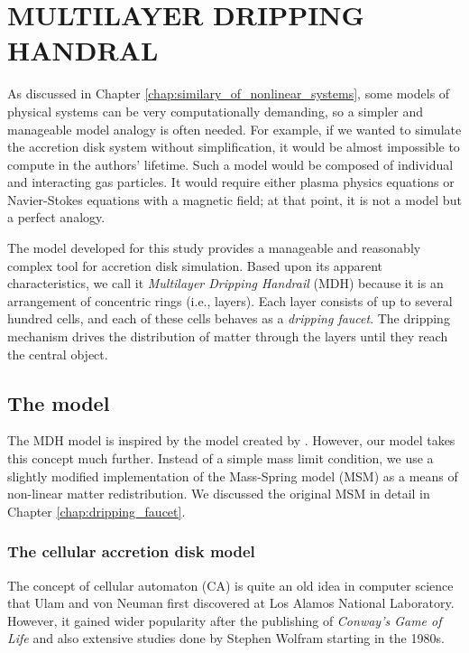 \chapter{MULTILAYER DRIPPING HANDRAL}
\thispagestyle{empty}


As discussed in Chapter \ref{chap:similary_of_nonlinear_systems}, some models of physical systems can be very computationally demanding, so a simpler and manageable model analogy is often needed. For example, if we wanted to simulate the accretion disk system without simplification, it would be almost impossible to compute in the authors' lifetime. Such a model would be composed of individual and interacting gas particles. It would require either plasma physics equations or Navier-Stokes equations with a magnetic field; at that point, it is not a model but a perfect analogy. 

The model developed for this study provides a manageable and reasonably complex tool for accretion disk simulation. Based upon its apparent characteristics, we call it \emph{Multilayer Dripping Handrail} (MDH) because it is an arrangement of concentric rings (i.e., layers). Each layer consists of up to several hundred cells, and each of these cells behaves as a \emph{dripping faucet}. The dripping mechanism drives the distribution of matter through the layers until they reach the central object.

\section{The model}

The MDH model is inspired by the model created by \cite{yonehara1997}. However, our model takes this concept much further. Instead of a simple mass limit condition, we use a slightly modified implementation of the Mass-Spring model (MSM) as a means of non-linear matter redistribution. We discussed the original MSM in detail in Chapter \ref{chap:dripping_faucet}. 

\subsection{The cellular accretion disk model}

The concept of cellular automaton (CA) is quite an old idea in computer science that Ulam and von Neuman first discovered at Los Alamos National Laboratory. However, it gained wider popularity after the publishing of \emph{Conway's Game of Life} \cite{gardner1970} and also extensive studies done by Stephen Wolfram starting in the 1980s.

